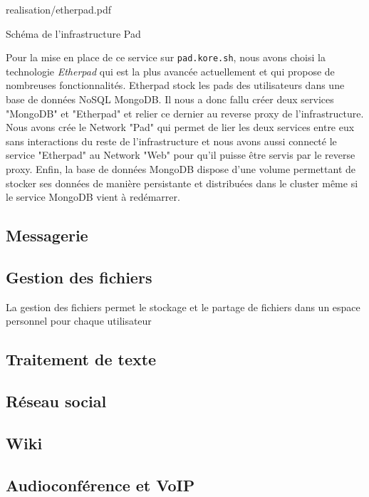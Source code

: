 \begin{figue}{0.7}{realisation/etherpad.pdf}
	\caption{Schéma de l'infrastructure Pad}
\end{figue}

Pour la mise en place de ce service sur \texttt{pad.kore.sh}, nous avons choisi la technologie \emph{Etherpad} qui est la plus avancée actuellement et qui propose de nombreuses fonctionnalités.
Etherpad stock les pads des utilisateurs dans une base de données NoSQL MongoDB.
Il nous a donc fallu créer deux services "MongoDB" et "Etherpad" et relier ce dernier au reverse proxy de l'infrastructure.
Nous avons crée le Network "Pad" qui permet de lier les deux services entre eux sans interactions du reste de l'infrastructure et nous avons aussi connecté le service "Etherpad" au Network "Web" pour qu'il puisse être servis par le reverse proxy.
Enfin, la base de données MongoDB dispose d'une volume permettant de stocker ses données de manière persistante et distribuées dans le cluster même si le service MongoDB vient à redémarrer.

\subsection{Messagerie}

\subsection{Gestion des fichiers}

La gestion des fichiers permet le stockage et le partage de fichiers dans un espace personnel pour chaque utilisateur 

\subsection{Traitement de texte}

\subsection{Réseau social}

\subsection{Wiki}

\subsection{Audioconférence et VoIP}

